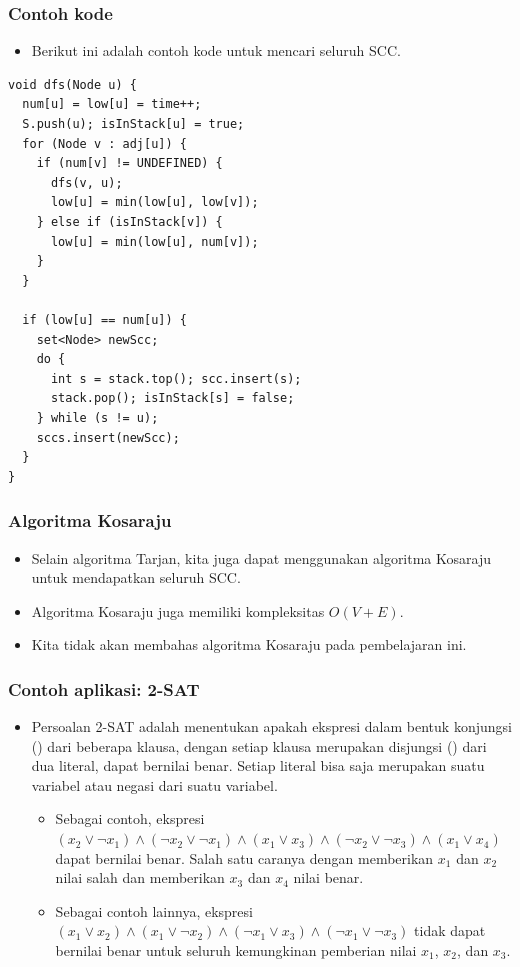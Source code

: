 \begin{frame}[fragile]
\frametitle{Contoh kode}
\begin{itemize}
  \item Berikut ini adalah contoh kode untuk mencari seluruh SCC.
\end{itemize}
\begin{lstlisting}
void dfs(Node u) {
  num[u] = low[u] = time++;
  S.push(u); isInStack[u] = true;
  for (Node v : adj[u]) {
    if (num[v] != UNDEFINED) {
      dfs(v, u);
      low[u] = min(low[u], low[v]);
    } else if (isInStack[v]) {
      low[u] = min(low[u], num[v]);
    }
  }

  if (low[u] == num[u]) {
    set<Node> newScc;
    do {
      int s = stack.top(); scc.insert(s);
      stack.pop(); isInStack[s] = false;
    } while (s != u);
    sccs.insert(newScc);
  }
}
\end{lstlisting}
\end{frame}

\begin{frame}
\frametitle{Algoritma Kosaraju}
\begin{itemize}
  \item Selain algoritma Tarjan, kita juga dapat menggunakan algoritma Kosaraju untuk mendapatkan seluruh SCC.
  \item Algoritma Kosaraju juga memiliki kompleksitas $O(V + E)$.
  \item Kita tidak akan membahas algoritma Kosaraju pada pembelajaran ini.
\end{itemize}
\end{frame}

\begin{frame}
\frametitle{Contoh aplikasi: 2-SAT}
\begin{itemize}
  \item Persoalan 2-SAT adalah menentukan apakah ekspresi dalam bentuk konjungsi (\fand) dari beberapa klausa, dengan setiap klausa merupakan disjungsi (\for) dari dua literal, dapat bernilai benar. Setiap literal bisa saja merupakan suatu variabel atau negasi dari suatu variabel.
  \begin{itemize}
    \item Sebagai contoh, ekspresi $(x_2 \lor \neg x_1) \land (\neg x_2 \lor \neg x_1) \land (x_1 \lor x_3) \land (\neg x_2 \lor \neg x_3) \land (x_1 \lor x_4)$ dapat bernilai benar. Salah satu caranya dengan memberikan $x_1$ dan $x_2$ nilai salah dan memberikan $x_3$ dan $x_4$ nilai benar.
    \item Sebagai contoh lainnya, ekspresi $(x_1 \lor x_2) \land (x_1 \lor \neg x_2) \land (\neg x_1 \lor x_3) \land (\neg x_1 \lor \neg x_3)$ tidak dapat bernilai benar untuk seluruh kemungkinan pemberian nilai $x_1$, $x_2$, dan $x_3$.
  \end{itemize}
\end{itemize}
\end{frame}


